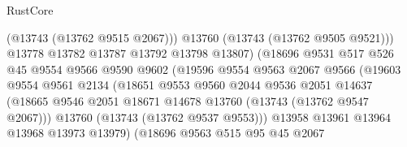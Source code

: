 \begin{lexlean}{RustCore}
\begin{coremodule}
                                        (@13743 (@13762 @9515 @2067)))
                                      @13760
                                      (@13743 (@13762 @9505 @9521)))
                                    @13778
                                    @13782
                                    @13787
                                    @13792
                                    @13798
                                    @13807)
                                  (@18696
                                    @9531
                                    @517
                                    @526
                                    @45
                                    @9554
                                    @9566
                                    @9590
                                    @9602
                                    (@19596
                                      @9554
                                      @9563
                                      @2067
                                      @9566
                                      (@19603
                                        @9554
                                        @9561
                                        @2134
                                        (@18651
                                          @9553
                                          @9560
                                          @2044
                                          @9536
                                          @2051
                                          @14637
                                          (@18665
                                            @9546
                                            @2051
                                            @18671
                                            @14678
                                            @13760
                                            (@13743 (@13762 @9547 @2067)))
                                          @13760
                                          (@13743 (@13762 @9537 @9553)))
                                        @13958
                                        @13961
                                        @13964
                                        @13968
                                        @13973
                                        @13979)
                                      (@18696
                                        @9563
                                        @515
                                        @95
                                        @45
                                        @2067

\end{coremodule}
\end{lexlean}

